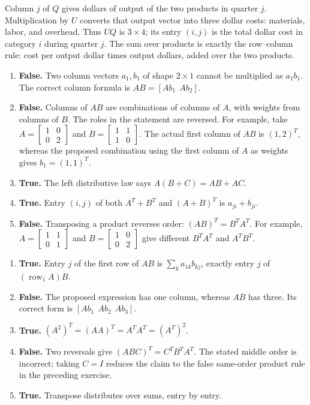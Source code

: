 Column $j$ of $Q$ gives dollars of output of the two products in quarter $j$.
Multiplication by $U$ converts that output vector into three dollar costs:
materials, labor, and overhead. Thus $UQ$ is $3\times4$; its entry $(i,j)$
is the total dollar cost in category $i$ during quarter $j$. The sum over
products is exactly the row--column rule: cost per output dollar times
output dollars, added over the two products.

\begin{enumerate}[label=(\alph*)]
\item \textbf{False.} Two column vectors $a_1,b_1$ of shape $2\times1$
cannot be multiplied as $a_1b_1$. The correct column formula is
$AB=[Ab_1\ \ Ab_2]$.
\item \textbf{False.} Columns of $AB$ are combinations of columns of
$A$, with weights from columns of $B$. The roles in the statement are reversed.
For example, take $A=\begin{bmatrix}1&0\\0&2\end{bmatrix}$ and
$B=\begin{bmatrix}1&1\\1&0\end{bmatrix}$. The actual first column of
$AB$ is $(1,2)^T$, whereas the proposed combination using the first
column of $A$ as weights gives $b_1=(1,1)^T$.
\item \textbf{True.} The left distributive law says $A(B+C)=AB+AC$.
\item \textbf{True.} Entry $(i,j)$ of both $A^T+B^T$ and $(A+B)^T$
is $a_{ji}+b_{ji}$.
\item \textbf{False.} Transposing a product reverses order:
$(AB)^T=B^TA^T$. For example,
$A=\begin{bmatrix}1&1\\0&1\end{bmatrix}$ and
$B=\begin{bmatrix}1&0\\0&2\end{bmatrix}$ give different $B^TA^T$ and $A^TB^T$.
\end{enumerate}

\begin{enumerate}[label=(\alph*)]
\item \textbf{True.} Entry $j$ of the first row of $AB$ is
$\sum_k a_{1k}b_{kj}$, exactly entry $j$ of $(\operatorname{row}_1A)B$.
\item \textbf{False.} The proposed expression has one column, whereas
$AB$ has three. Its correct form is $[Ab_1\ \ Ab_2\ \ Ab_3]$.
\item \textbf{True.} $(A^2)^T=(AA)^T=A^TA^T=(A^T)^2$.
\item \textbf{False.} Two reversals give $(ABC)^T=C^TB^TA^T$.
The stated middle order is incorrect; taking $C=I$ reduces the claim
to the false same-order product rule in the preceding exercise.
\item \textbf{True.} Transpose distributes over sums, entry by entry.
\end{enumerate}

